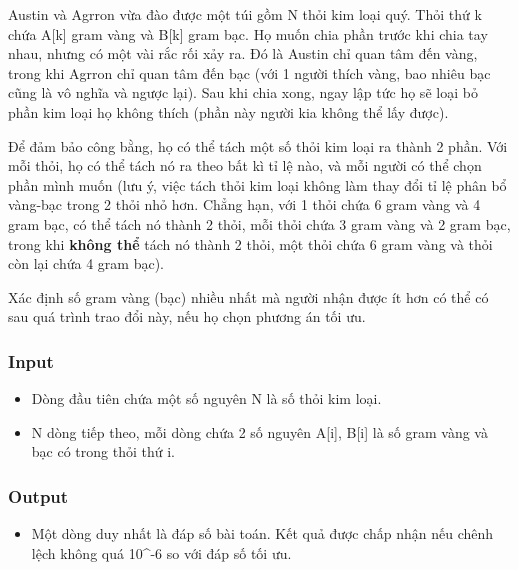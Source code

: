 



   Austin và Agrron vừa đào được một túi gồm N thỏi kim loại quý. Thỏi thứ k chứa A[k] gram vàng và B[k] gram bạc. Họ muốn chia phần trước khi chia tay nhau, nhưng có một vài rắc rối xảy ra. Đó là Austin chỉ quan tâm đến vàng, trong khi Agrron chỉ quan tâm đến bạc (với 1 người thích vàng, bao nhiêu bạc cũng là vô nghĩa và ngược lại). Sau khi chia xong, ngay lập tức họ sẽ loại bỏ phần kim loại họ không thích (phần này người kia không thể lấy được).  



   Để đảm bảo công bằng, họ có thể tách một số thỏi kim loại ra thành 2 phần. Với mỗi thỏi, họ có thể tách nó ra theo bất kì tỉ lệ nào, và mỗi người có thể chọn phần mình muốn (lưu ý, việc tách thỏi kim loại không làm thay đổi tỉ lệ phân bổ vàng-bạc trong 2 thỏi nhỏ hơn. Chẳng hạn, với 1 thỏi chứa 6 gram vàng và 4 gram bạc, có thể tách nó thành 2 thỏi, mỗi thỏi chứa 3 gram vàng và 2 gram bạc, trong khi   \textbf{    không thể   }   tách nó thành 2 thỏi, một thỏi chứa 6 gram vàng và thỏi còn lại chứa 4 gram bạc).  



   Xác định số gram vàng (bạc) nhiều nhất mà người nhận được ít hơn có thể có sau quá trình trao đổi này, nếu họ chọn phương án tối ưu.  

\subsubsection{   Input  }
\begin{itemize}
	\item     Dòng đầu tiên chứa một số nguyên N là số thỏi kim loại.   
	\item     N dòng tiếp theo, mỗi dòng chứa 2 số nguyên A[i], B[i] là số gram vàng và bạc có trong thỏi thứ i.   
\end{itemize}



\subsubsection{   Output  }
\begin{itemize}
	\item     Một dòng duy nhất là đáp số bài toán. Kết quả được chấp nhận nếu chênh lệch không quá 10\textasciicircum-6 so với đáp số tối ưu.   
\end{itemize}



